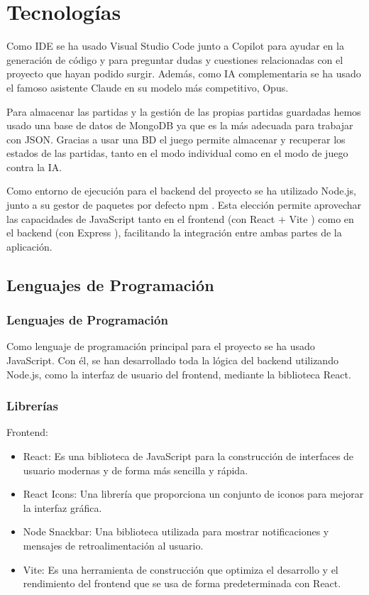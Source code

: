 \documentclass[12pt,epsf,titlepage,a4paper]{article}
\begin{document}
\section{Tecnologías}
Como IDE se ha usado Visual Studio Code \cite{vscode} junto a Copilot \cite{vscopilot} para ayudar en la generación de código y para preguntar dudas y cuestiones relacionadas con el proyecto que hayan podido surgir. Además, como IA complementaria se ha usado el famoso asistente Claude \cite{claude} en su modelo más competitivo, Opus.

Para almacenar las partidas y la gestión de las propias partidas guardadas hemos usado una base de datos de MongoDB \cite{mongowebpage} ya que es la más adecuada para trabajar con JSON. Gracias a usar una BD el juego permite almacenar y recuperar los estados de las partidas, tanto en el modo individual como en el modo de juego contra la IA.

Como entorno de ejecución para el backend del proyecto se ha utilizado Node.js, junto a su gestor de paquetes por defecto npm \cite{npm}. Esta elección permite aprovechar las capacidades de JavaScript tanto en el frontend (con React \cite{react} $+$ Vite \cite{vite}) como en el backend (con Express \cite{express}), facilitando la integración entre ambas partes de la aplicación.

\subsection{Lenguajes de Programación}

\subsubsection{Lenguajes de Programación}
Como lenguaje de programación principal para el proyecto se ha usado JavaScript. Con él, se han desarrollado toda la lógica del backend  utilizando Node.js, como la interfaz de usuario del frontend, mediante la biblioteca React.
\subsubsection{Librerías}

Frontend:
\begin{itemize}
    \item React: Es una biblioteca de JavaScript para la construcción de interfaces de usuario modernas y de forma más sencilla y rápida.
    \item React Icons: Una librería que proporciona un conjunto de iconos para mejorar la interfaz gráfica.
    \item Node Snackbar: Una biblioteca utilizada para mostrar notificaciones y mensajes de retroalimentación al usuario.
    \item Vite: Es una herramienta de construcción que optimiza el desarrollo y el rendimiento del frontend que se usa de forma predeterminada con React.
\end{itemize}
\end{document}
